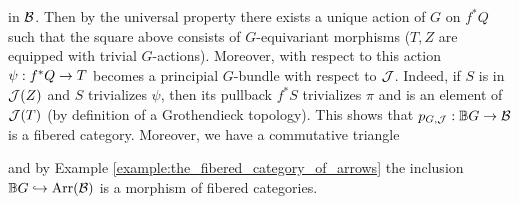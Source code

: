 in ${\mathcal B}$. Then by the universal property there exists a unique action of $G$ on $f^*Q$ such that the square above consists of $G$-equivariant morphisms ($T,Z$ are equipped with trivial $G$-actions). Moreover, with respect to this action $\psi:f^*Q\rightarrow T$ becomes a principial $G$-bundle with respect to ${\mathcal J}$. Indeed, if $S$ is in ${\mathcal J}(Z)$ and $S$ trivializes $\psi$, then its pullback $f^*S$ trivializes $\pi$ and is an element of ${\mathcal J}(T)$ (by definition of a Grothendieck topology). This shows that $p_{G,{\mathcal J}}:\mathbb{B}G\rightarrow {\mathcal B}$ is a fibered category. Moreover, we have a commutative triangle
\begin{center}
\end{center}
and by Example \ref{example:the_fibered_category_of_arrows} the inclusion $\mathbb{B}G\hookrightarrow \mathrm{Arr}({\mathcal B})$ is a morphism of fibered categories.

